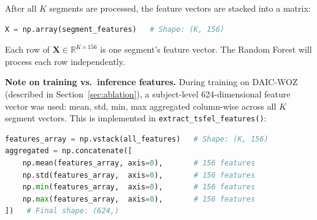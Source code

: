 After all $K$ segments are processed, the feature vectors are stacked into a matrix:

\begin{lstlisting}[language=Python, caption={Stacking segment features.}]
X = np.array(segment_features)   # Shape: (K, 156)
\end{lstlisting}

Each row of $\mathbf{X} \in \mathbb{R}^{K \times 156}$ is one segment's feature vector. The Random Forest will process each row independently.

\medskip
\noindent\textbf{Note on training vs.\ inference features.} During training on DAIC-WOZ (described in Section~\ref{sec:ablation}), a subject-level 624-dimensional feature vector was used: mean, std, min, max aggregated column-wise across all $K$ segment vectors. This is implemented in \texttt{extract\_tsfel\_\allowbreak features()}:

\begin{lstlisting}[language=Python, caption={624-dim aggregated features for training (depression\_prediction.py).}]
features_array = np.vstack(all_features)   # Shape: (K, 156)
aggregated = np.concatenate([
    np.mean(features_array, axis=0),       # 156 features
    np.std(features_array,  axis=0),       # 156 features
    np.min(features_array,  axis=0),       # 156 features
    np.max(features_array,  axis=0),       # 156 features
])   # Final shape: (624,)
\end{lstlisting}


